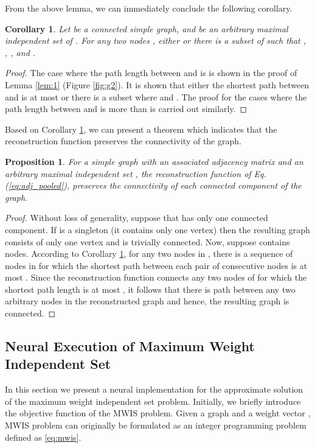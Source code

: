 \documentclass{article}
\newtheorem{prop}{Proposition}
\newtheorem{corollary}{Corollary}
\begin{document}
From the above lemma, we can immediately conclude the following corollary.

\begin{corollary}\label{cor:1}
	Let  be a connected simple graph, and  be an arbitrary maximal independent set of . For any two nodes , either  or there is a subset  of  such that , , , and .\bigskip
\end{corollary}

\begin{proof}
	The case where the path length between  and  is  is shown in the proof of Lemma \ref{lem:1} (Figure \ref{fig:g2}). It is shown that either the shortest path between  and  is at most  or there is a subset  where  and . The proof for the cases where the path length between  and  is more than  is carried out similarly.
\end{proof}

Based on Corollary \ref{cor:1}, we can present a theorem which indicates that the reconstruction function preserves the connectivity of the graph.

\begin{prop}
	For a simple graph  with an associated adjacency matrix  and an arbitrary maximal independent set , the reconstruction function of Eq.(\ref{eq:adj_pooled}), preserves the connectivity of each connected component of the graph.
\end{prop}

\begin{proof}
	Without loss of generality, suppose that  has only one connected component. If  is a singleton (it contains only one vertex) then the resulting graph consists of only one vertex and is trivially connected. Now, suppose  contains  nodes. According to Corollary \ref{cor:1}, for any two nodes in , there is a sequence of nodes in  for which the shortest path between each pair of consecutive nodes is at most . Since the reconstruction function  connects any two nodes of  for which the shortest path length is at most , it follows that there is path between any two arbitrary nodes in the reconstructed graph and hence, the resulting graph is connected.
\end{proof}
\subsection{Neural Execution of Maximum Weight Independent Set}
\label{subsec:ne_mwis}

In this section we present a neural implementation for the approximate solution of the maximum weight independent set problem. Initially, we briefly introduce the objective function of the MWIS problem. Given a graph  and a weight vector , MWIS problem can originally be formulated as an integer programming problem defined as \ref{eq:mwis}.
\end{document}
